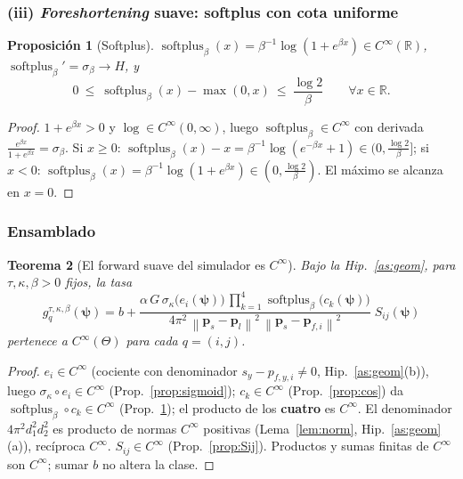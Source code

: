 \documentclass[11pt,a4paper]{article}
\theoremstyle{plain}
\newtheorem{theorem}{Teorema}
\newtheorem{proposition}[theorem]{Proposici\'on}
\theoremstyle{definition}
\newcommand{\vect}[1]{\boldsymbol{#1}}
\newcommand{\R}{\mathbb{R}}
\newcommand{\softplus}{\operatorname{softplus}}
\newcommand{\norm}[1]{\left\lVert #1 \right\rVert}
\begin{document}
\subsubsection*{(iii) \emph{Foreshortening} suave: softplus con cota uniforme}

\begin{proposition}[Softplus]\label{prop:softplus}
$\softplus_\beta(x)=\beta^{-1}\log(1+e^{\beta x})\in C^\infty(\R)$,
$\softplus_\beta'=\sigma_\beta\to H$, y
\begin{equation}
    0\ \le\ \softplus_\beta(x)-\max(0,x)\ \le\ \frac{\log 2}{\beta}
    \qquad\forall x\in\R.
    \label{eq:sp-bound}
\end{equation}
\end{proposition}
\begin{proof}
$1+e^{\beta x}>0$ y $\log\in C^\infty(0,\infty)$, luego $\softplus_\beta\in
C^\infty$ con derivada $\frac{e^{\beta x}}{1+e^{\beta x}}=\sigma_\beta$. Si
$x\ge0$: $\softplus_\beta(x)-x=\beta^{-1}\log(e^{-\beta x}+1)\in(0,\frac{\log2}{\beta}]$;
si $x<0$: $\softplus_\beta(x)=\beta^{-1}\log(1+e^{\beta x})\in(0,\frac{\log2}{\beta})$.
El m\'aximo se alcanza en $x=0$.
\end{proof}

\subsubsection*{Ensamblado}

\begin{theorem}[El forward suave del simulador es $C^\infty$]\label{thm:g-smooth}
Bajo la Hip.~\ref{as:geom}, para $\tau,\kappa,\beta>0$ fijos, la tasa
\begin{equation}
    g^{\tau,\kappa,\beta}_q(\vect{\psi})
    =b+\frac{\alpha\,G\,
        \sigma_\kappa\!\bigl(e_i(\vect{\psi})\bigr)\,
        \prod_{k=1}^{4}\softplus_\beta\!\bigl(c_k(\vect{\psi})\bigr)}
        {4\pi^2\,
         \norm{\vect{p}_s-\vect{p}_l}^2\,\norm{\vect{p}_s-\vect{p}_{f,i}}^2}\;
    S_{ij}(\vect{\psi})
    \label{eq:g-smooth-def}
\end{equation}
pertenece a $C^\infty(\Theta)$ para cada $q=(i,j)$.
\end{theorem}
\begin{proof}
$e_i\in C^\infty$ (cociente con denominador $s_y-p_{f,y,i}\neq0$,
Hip.~\ref{as:geom}(b)), luego $\sigma_\kappa\circ e_i\in C^\infty$
(Prop.~\ref{prop:sigmoid}); $c_k\in C^\infty$ (Prop.~\ref{prop:cos}) da
$\softplus_\beta\circ c_k\in C^\infty$ (Prop.~\ref{prop:softplus}); el producto de
los \textbf{cuatro} es $C^\infty$. El denominador $4\pi^2 d_1^2 d_2^2$ es producto
de normas $C^\infty$ positivas (Lema~\ref{lem:norm}, Hip.~\ref{as:geom}(a)),
rec\'iproca $C^\infty$. $S_{ij}\in C^\infty$ (Prop.~\ref{prop:Sij}). Productos y
sumas finitas de $C^\infty$ son $C^\infty$; sumar $b$ no altera la clase.
\end{proof}
\end{document}
